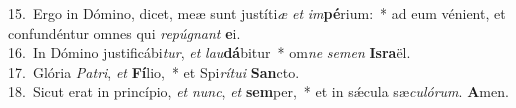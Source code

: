 {15.~}Ergo in Dómino, dicet, meæ sunt justíti\textit{æ} \textit{et} \textit{im}\textbf{pé}rium:~* ad eum vénient, et confundéntur omnes qui \textit{re}\textit{pú}\textit{gnant} \textbf{e}i.\\
{16.~}In Dómino justificábi\textit{tur}, \textit{et} \textit{lau}\textbf{dá}bitur~* om\textit{ne} \textit{se}\textit{men} \textbf{Is}\textbf{ra}ël.\\
{17.~}Glória \textit{Pa}\textit{tri}, \textit{et} \textbf{Fí}lio,~* et Spi\textit{rí}\textit{tu}\textit{i} \textbf{San}cto.\\
{18.~}Sicut erat in princípio, \textit{et} \textit{nunc}, \textit{et} \textbf{sem}per,~* et in sǽcula sæ\textit{cu}\textit{ló}\textit{rum}. \textbf{A}men.\\
